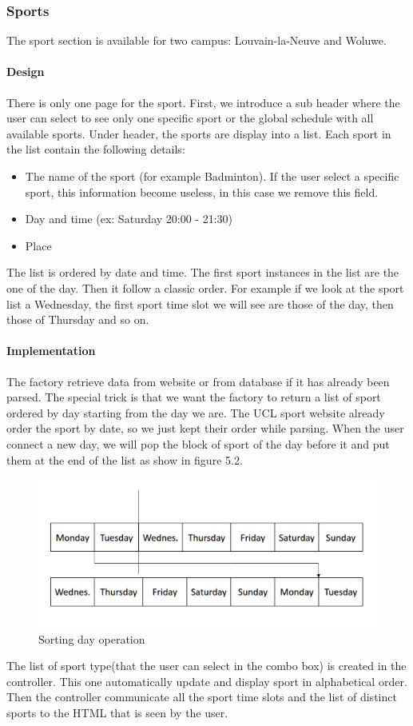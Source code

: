 \documentclass[11pt, a4paper]{report}
\begin{document}
\subsubsection{Sports}
The sport section is available for two campus: Louvain-la-Neuve and Woluwe. 
\paragraph{Design}
There is only one page for the sport. First, we introduce a sub header where the user can select to see only one specific sport or the global schedule with all available sports. Under header, the sports are display into a list. Each sport in the list contain the following details:
\begin{itemize}
\item The name of the sport (for example Badminton). If the user select a specific sport, this information become useless, in this case we remove this field.
\item Day and time (ex: Saturday 20:00 - 21:30)
\item Place 
\end{itemize}
The list is ordered by date and time. The first sport instances in the list are the one of the day. Then it follow a classic order. For example if we look at the sport list a Wednesday, the first sport time slot we will see are those of the day, then those of Thursday and so on. 
\paragraph{Implementation}
The factory retrieve data from website or from database if it has already been parsed. The special trick is that we want the factory to return a list of sport ordered by day starting from the day we are. The UCL sport website already order the sport by date, so we just kept their order while parsing. When the user connect a new day, we will pop the block of sport of the day before it and put them at the end of the list as show in figure 5.2.
\begin{figure}
\centering
\includegraphics[scale = 0.3]{Images/sportsorting.png}
\caption{Sorting day operation}
\end{figure}
The list of sport type(that the user can select in the combo box) is created in the controller. This one automatically update and display sport in alphabetical order. Then the controller communicate all the sport time slots and the list of distinct sports to the HTML that is seen by the user. 
\end{document}
